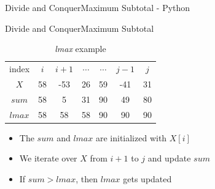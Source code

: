 {%

\begin{frame}{Divide and Conquer}{Maximum Subtotal - Python}
  \vspace{-0.5em}
  
\end{frame}
}



\begin{frame}{Divide and Conquer}{Maximum Subtotal}
  \begin{table}
    \caption{\textit{lmax} example}
    \label{fig:divide_and_conquer:lmax_example}
    \begin{tabular}{c|cccccc}
      index & $i$ & $i+1$ & $\cdots$ & $\cdots$ & $j-1$ & $j$\\
      $X$ & 58 & -53 & 26 & 59 & -41 & 31\\
       {\color{MainA}$sum$} & 58 & 5 & 31 & 90 & 49 & 80\\
      {\color{MainA}$lmax$} & 58 & 58 & 58 & 90 & 90 & 90\\
    \end{tabular}
  \end{table}
  \begin{itemize}
    \item<2->
      The {\color{MainA}$sum$} and {\color{MainA}$lmax$} are initialized with $X[i]$
    \item<3->
      We iterate over {\color{MainA}$X$} from {\color{MainA}$i+1$} to {\color{MainA}$j$} and update {\color{MainA}$sum$}
    \item<4->
      If {\color{MainA}$sum > lmax$}, then {\color{MainA}$lmax$}
      gets updated
  \end{itemize}
\end{frame}


